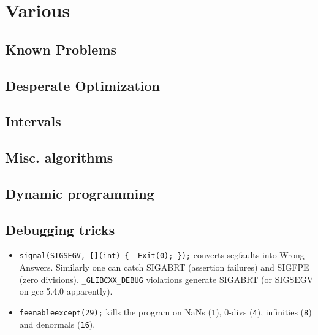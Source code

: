 \chapter{Various}

\section{Known Problems}

\section{Desperate Optimization}

\section{Intervals}

\section{Misc. algorithms}

\section{Dynamic programming}

\section{Debugging tricks}
\begin{itemize}
	\item \texttt{signal(SIGSEGV, [](int) \{ \_Exit(0); \});} converts segfaults into Wrong Answers.
	      Similarly one can catch SIGABRT (assertion failures) and SIGFPE (zero divisions).
	      \texttt{\_GLIBCXX\_DEBUG} violations generate SIGABRT (or SIGSEGV on gcc 5.4.0 apparently).
	\item \texttt{feenableexcept(29);} kills the program on NaNs (\texttt 1), 0-divs (\texttt 4), infinities (\texttt 8) and denormals (\texttt{16}).
\end{itemize}

